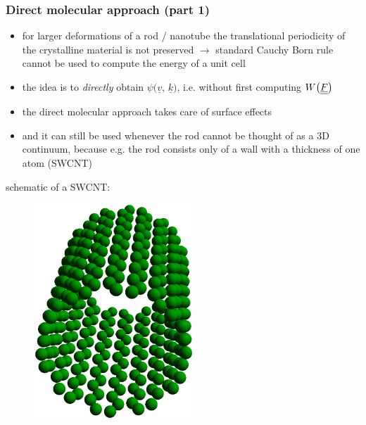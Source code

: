 \begin{frame}
  \frametitle{Direct molecular approach (part 1)}
  
  \begin{itemize}
    \item for larger deformations of a rod / nanotube the translational periodicity of the crystalline material is not preserved \newline
      $\rightarrow$ standard Cauchy Born rule cannot be used to compute the energy of a unit cell
    \item the idea is to \textit{directly} obtain $\psi \bigl( \underline{v}, \, \underline{k} \bigr)$, i.e. without first computing $W \bigl( \underline{\underline{F}} \bigr)$
    \item the direct molecular approach takes care of surface effects
    \item and it can still be used whenever the rod cannot be thought of as a 3D continuum, \newline because e.g. the rod consists only of a wall with a thickness of one atom (SWCNT)
  \end{itemize}
  
  \vspace{0.5em}
  schematic of a SWCNT:
  
  \vspace{-2em}
  \begin{figure}
      \centering
      \includegraphics[width=6cm, keepaspectratio=true]{sections/cosserat_rods/images/SWCNT}
  \end{figure}
  
\end{frame}


